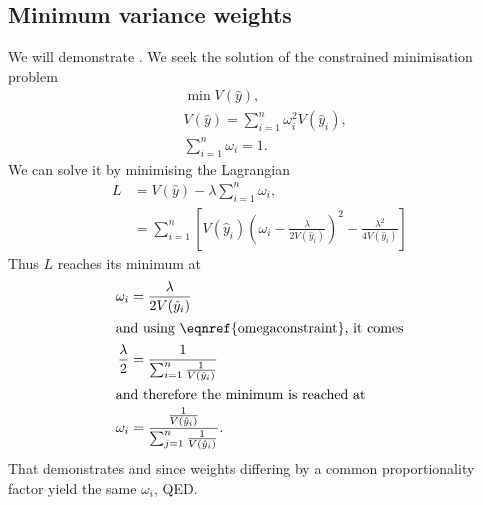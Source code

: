 \documentclass[11pt]{article}
\begin{document}
\begin{appendices}
\section{Minimum variance weights}
\label{apendixa}

We will demonstrate . We seek the solution of the constrained minimisation problem
\begin{align}
&\min V(\hat{y}),\\
&V(\hat{y}) = \sum_{i=1}^n \omega_i^2 V(\hat{y}_i),\\
&\sum_{i=1}^n \omega_i = 1.
\label{eqn:omegaconstraint}
\end{align}
We can solve it by minimising the Lagrangian
\begin{align}
L &= V(\hat{y}) - \lambda \sum_{i=1}^n \omega_i,\\
  &= \sum_{i=1}^n \left[V(\hat{y}_i)\left(\omega_i - \frac{\lambda}{2V(\hat{y}_i)} \right)^2 - \frac{\lambda^2}{4V(\hat{y}_i)} \right]
\end{align}
Thus $L$ reaches its minimum at
\begin{align}
\omega_i &= \frac{\lambda}{2V(\hat{y}_i)}\\
\intertext{and using \eqnref{omegaconstraint}, it comes}
\frac{\lambda}{2} &= \frac{1}{\sum_{i=1}^n \frac{1}{V(\hat{y}_i)}}\\
\intertext{and therefore the minimum is reached at}
\omega_i &= \frac{\frac{1}{V(\hat{y}_i)}}{\sum_{j=1}^n \frac{1}{V(\hat{y}_i)}}.
\end{align}
That demonstrates  and since weights differing by a common proportionality factor yield the same $\omega_i$, QED.


\end{appendices}
\end{document}

